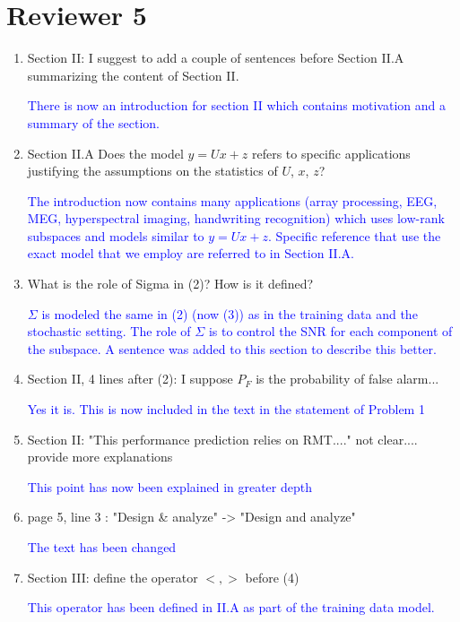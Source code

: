 \documentclass[11pt]{article}
\begin{document}
\section*{Reviewer 5}
\begin{enumerate}
\item Section II: I suggest to add a couple of sentences before Section II.A summarizing the content of Section II.

  \textcolor{blue}{There is now an introduction for section II which contains motivation and a summary of the section.}

\item Section II.A Does the model $y=Ux+z$ refers to specific applications justifying the assumptions on the statistics of $U$, $x$, $z$?

  \textcolor{blue}{The introduction now contains many applications (array processing, EEG, MEG, hyperspectral imaging, handwriting recognition) which uses low-rank subspaces and models similar to $y=Ux+z$. Specific reference that use the exact model that we employ are referred to in Section II.A.}

\item What is the role of Sigma in (2)? How is it defined?

  \textcolor{blue}{$\Sigma$ is modeled the same in (2) (now (3)) as in the training data and the stochastic setting. The role of $\Sigma$ is to control the SNR for each component of the subspace. A sentence was added to this section to describe this better.}

\item Section II, 4 lines after (2): I suppose $P_F$ is the probability of false alarm...

\textcolor{blue}{Yes it is. This is now included in the text in the statement of Problem 1}

\item Section II: "This performance prediction relies on RMT...." not clear.... provide more explanations

\textcolor{blue}{This point has now been explained in greater depth}

\item page 5, line 3 : "Design \& analyze" ->   "Design and analyze"
  
  \textcolor{blue}{The text has been changed}

\item Section III: define the operator $<,>$ before (4)

  \textcolor{blue}{This operator has been defined in II.A as part of the training data model.}


\end{enumerate}
\end{document}
